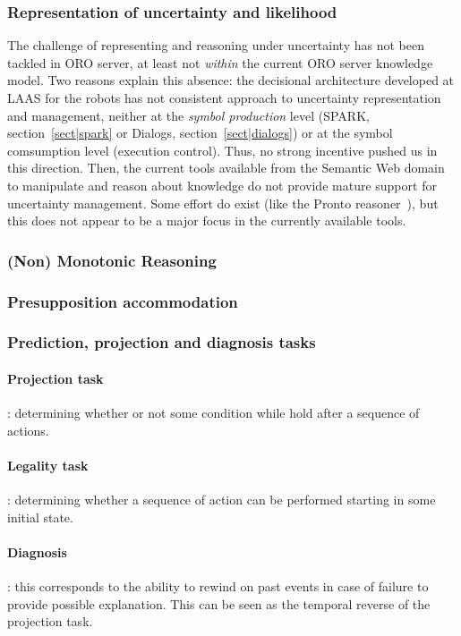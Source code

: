\subsubsection{Representation of uncertainty and likelihood}

The challenge of representing and reasoning under uncertainty has not been
tackled in ORO server, at least not \emph{within} the current ORO server
knowledge model. Two reasons explain this absence: the decisional architecture
developed at LAAS for the robots has not consistent approach to uncertainty
representation and management, neither at the \emph{symbol production} level
(\ie SPARK, section~\ref{sect|spark} or {\sc Dialogs},
section~\ref{sect|dialogs}) or at the symbol comsumption level (execution
control). Thus, no strong incentive pushed us in this direction. Then, the
current tools available from the Semantic Web domain to manipulate and reason
about knowledge do not provide mature support for uncertainty management. Some
effort do exist (like the {\sc Pronto} reasoner~\cite{Klinov2008}), but this
does not appear to be a major focus in the currently available tools.


\subsubsection{(Non) Monotonic Reasoning}
\subsubsection{Presupposition accommodation}
\subsubsection{Prediction, projection and diagnosis tasks}
\paragraph{Projection task}: determining whether or not some condition while
hold after a sequence of actions.

\paragraph{Legality task}: determining whether a sequence of action can be
performed starting in some initial state.

\paragraph{Diagnosis}: this corresponds to the ability to rewind on past events
in case of failure to provide possible explanation. This can be seen as the
temporal reverse of the projection task.


